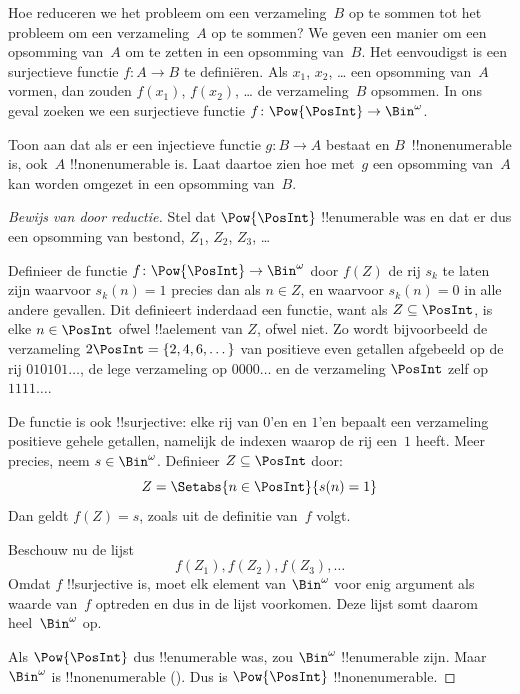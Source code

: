 \documentclass[openany]{memoir}
\begin{document}
Hoe reduceren we het probleem om een verzameling~$B$ op te sommen tot
het probleem om een verzameling~$A$ op te sommen? We geven een manier
om een opsomming van~$A$ om te zetten in een opsomming van~$B$. Het
eenvoudigst is een surjectieve functie $f\colon A \to B$ te
definiëren. Als $x_1$, $x_2$, \dots{} een opsomming van~$A$ vormen,
dan zouden $f(x_1)$, $f(x_2)$, \dots{} de verzameling~$B$ opsommen. In
ons geval zoeken we een surjectieve functie $f\colon \Pow{\PosInt} \to
\Bin^\omega$.

\begin{prob}
Toon aan dat als er een injectieve functie $g\colon B \to A$ bestaat
en $B$~!!{nonenumerable} is, ook~$A$ !!{nonenumerable} is. Laat daartoe
zien hoe met~$g$ een opsomming van~$A$ kan worden omgezet in een
opsomming van~$B$.
\end{prob}

\begin{proof}[Bewijs van {} door reductie]
Stel dat $\Pow{\PosInt}$ !!{enumerable} was en dat er dus een
opsomming van bestond, $Z_{1}$, $Z_{2}$, $Z_{3}$, \dots

Definieer de functie $f \colon \Pow{\PosInt} \to \Bin^\omega$ door
$f(Z)$ de rij $s_{k}$ te laten zijn waarvoor $s_{k}(n) = 1$ precies
dan als $n \in Z$, en waarvoor $s_k(n) = 0$ in alle andere gevallen.
Dit definieert inderdaad een functie, want als $Z \subseteq \PosInt$,
is elke $n \in \PosInt$ ofwel !!a{element} van $Z$, ofwel niet. Zo
wordt bijvoorbeeld de verzameling $2\PosInt = \{2, 4, 6, \dots\}$ van
positieve even getallen afgebeeld op de rij $010101\dots$, de lege
verzameling op $0000\dots$ en de verzameling $\PosInt$ zelf op
$1111\dots$.

De functie is ook !!{surjective}: elke rij van $0$'en en $1$'en bepaalt
een verzameling positieve gehele getallen, namelijk de indexen waarop de
rij een~$1$ heeft. Meer precies, neem $s \in \Bin^\omega$. Definieer
$Z \subseteq \PosInt$ door:
\[
Z = \Setabs{n \in \PosInt}{s(n) = 1}
\]
Dan geldt $f(Z) = s$, zoals uit de definitie van~$f$ volgt.

Beschouw nu de lijst
\[
f(Z_1), f(Z_2), f(Z_3), \dots
\]
Omdat $f$ !!{surjective} is, moet elk element van $\Bin^\omega$ voor
enig argument als waarde van~$f$ optreden en dus in de lijst voorkomen.
Deze lijst somt daarom heel~$\Bin^\omega$ op.

Als $\Pow{\PosInt}$ dus !!{enumerable} was, zou $\Bin^\omega$
!!{enumerable} zijn. Maar $\Bin^\omega$ is !!{nonenumerable}
(). Dus is $\Pow{\PosInt}$
!!{nonenumerable}.
\end{proof}
\end{document}

